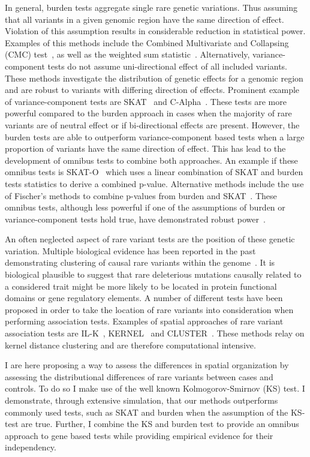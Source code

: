 In general, burden tests aggregate single rare genetic variations.
Thus assuming that all variants in a given genomic region have the same direction of effect.
Violation of this assumption results in considerable reduction in statistical power.
Examples of this methods include the Combined Multivariate and Collapsing (CMC) test~\cite{Li2008}, as well as the weighted sum statistic~\cite{Madsen2009}.
Alternatively, variance-component tests do not assume uni-directional effect of all included variants. 
These methods investigate the distribution of genetic effects for a genomic region and are robust to variants with differing direction of effects.
Prominent example of variance-component tests are SKAT~\cite{Wu2011} and C-Alpha~\cite{Neale2011}.
These tests are more powerful compared to the burden approach in cases when the majority of rare variants are of neutral effect or if bi-directional effects are present.
However, the burden tests are able to outperform variance-component based tests when a large proportion of variants have the same direction of effect.
This has lead to the development of omnibus tests to combine both approaches.
An example if these omnibus tests is SKAT-O~\cite{Lee2012a} which uses a linear combination of SKAT and burden tests statistics to derive a combined p-value.
Alternative methods include the use of Fischer's methods to combine p-values from burden and SKAT~\cite{Derkach2013a}.
These omnibus tests, although less powerful if one of the assumptions of burden or variance-component tests hold true, have demonstrated robust power~\cite{Lee2014}. 

An often neglected aspect of rare variant tests are the position of these genetic variation.
Multiple biological evidence has been reported in the past demonstrating clustering of causal rare variants within the genome~\cite{Ionita-Laza2012}.%
It is biological plausible to suggest that rare deleterious mutations causally related to a considered trait might be more likely to be located in protein functional domains or gene regulatory elements. %
A number of different tests have been proposed in order to take the location of rare variants into consideration when performing association tests.
Examples of spatial approaches of rare variant association tests are IL-K~\cite{Ionita-Laza2012}, KERNEL~\cite{Schaid2013} and CLUSTER~\cite{Lin2014}.
These methods relay on kernel distance clustering and are therefore computational intensive. %

I are here proposing a way to assess the differences in spatial organization by assessing the distributional differences of rare variants between cases and controls.
To do so I make use of the well known Kolmogorov-Smirnov (KS) test.
I demonstrate, through extensive simulation, that our methods outperforms commonly used tests, such as SKAT and burden when the assumption of the KS-test are true.
Further, I combine the KS and burden test to provide an omnibus approach to gene based tests while providing empirical evidence for their independency.
